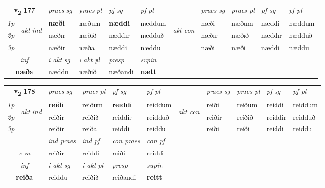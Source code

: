 \noindent
\begin{tabular}{lllllllllll} \toprule
\multicolumn{2}{c}{\textbf{v{\textsubscript{2}}} \Large{\textbf{177}}}  &  \textit{praes sg}  & \textit{praes pl}  &\textit{ pf sg} & \textit{pf pl} &  &  \textit{praes sg}  & \textit{praes pl}  & \textit{pf sg} & \textit{pf pl } \\*
	\cmidrule{3-6} \cmidrule{8-11}
 {\textit{1p}} & \multirow{3}{*}{\begin{turn}{90}\textit{akt ind}\end{turn}} & \textbf{næði} & næðum & \textbf{næddi} & næddum & \multirow{3}{*}{\begin{turn}{90}\textit{akt con}\end{turn}} &næði & næðum & næddi & næddum\\*
 {\textit{2p}} &  &  næðir  & næðið & næddir & nædduð & & næðir & næðið & næddir & nædduð \\*
{\textit{3p}} &  & næðir & næða & næddi & næddu & & næði & næði& næddi & næddu \\*
\cmidrule{3-6} \cmidrule{8-11}

   \multicolumn{2}{c}{\textit{inf}}  & \textit{i akt sg} & \textit{i akt pl}   & \textit{presp} & \textit{supin}   \\*
  \multicolumn{2}{c}{\textbf{næða}} & næddu  & næðið   & næðandi &  \textbf{nætt}   \\*
\end{tabular}

\noindent
\begin{tabular}{lllllllllll} \toprule
\multicolumn{2}{c}{\textbf{v{\textsubscript{2}}} \Large{\textbf{178}}}  &  \textit{praes sg}  & \textit{praes pl}  &\textit{ pf sg} & \textit{pf pl} &  &  \textit{praes sg}  & \textit{praes pl}  & \textit{pf sg} & \textit{pf pl } \\*
	\cmidrule{3-6} \cmidrule{8-11}
 {\textit{1p}} & \multirow{3}{*}{\begin{turn}{90}\textit{akt ind}\end{turn}} & \textbf{reiði} & reiðum & \textbf{reiddi} & reiddum & \multirow{3}{*}{\begin{turn}{90}\textit{akt con}\end{turn}} &reiði & reiðum & reiddi & reiddum\\*
 {\textit{2p}} &  &  reiðir  & reiðið & reiddir & reidduð & & reiðir & reiðið & reiddir & reidduð \\*
{\textit{3p}} &  & reiðir & reiða & reiddi & reiddu & & reiði & reiði& reiddi & reiddu \\*
\cmidrule{3-6} \cmidrule{8-11}

   & &  \textit{ind praes} & \textit{ind pf} & \textit{con praes} & \textit{con pf} \\*
\multicolumn{2}{c}{ \textit{e-m} } & reiðir & reiddi & reiði & reiddi \\*

\cmidrule{3-6}
   \multicolumn{2}{c}{\textit{inf}}  & \textit{i akt sg} & \textit{i akt pl}   & \textit{presp} & \textit{supin}   \\*
  \multicolumn{2}{c}{\textbf{reiða}} & reiddu  & reiðið   & reiðandi &  \textbf{reitt}   \\*
\end{tabular}

